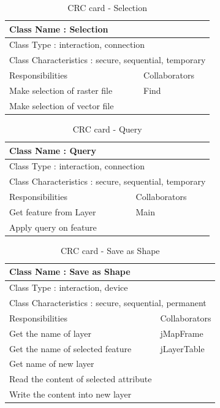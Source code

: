 \begin{table}[h]
\begin{tabular}{|p{7cm}|p{7cm}|}
  \hline
  \multicolumn{2}{|l|}{ Class Name :   Selection} \\
  \hline
  \multicolumn{2}{|l|}{ Class Type : interaction, connection} \\
  \hline
  \multicolumn{2}{|l|}{ Class Characteristics : secure, sequential, temporary} \\
  \hline
  Responsibilities & Collaborators  \\
  \hline
  Make selection of raster file & Find \\
  Make selection of vector file & \\
  \hline
\end{tabular}
\caption[CRC card - Selection]{CRC card - Selection}
\end{table}

\begin{table}[h]
\begin{tabular}{|p{7cm}|p{7cm}|}
  \hline
  \multicolumn{2}{|l|}{ Class Name : Query} \\
  \hline
  \multicolumn{2}{|l|}{ Class Type : interaction, connection} \\
  \hline
  \multicolumn{2}{|l|}{ Class Characteristics : secure, sequential, temporary} \\
  \hline
  Responsibilities & Collaborators  \\
  \hline
  Get feature from Layer  & Main\\
  Apply query on feature & \\
  \hline
\end{tabular}
\caption[CRC card - Query]{CRC card - Query}
\end{table}

\begin{table}[h]
\begin{tabular}{|p{7cm}|p{7cm}|}
  \hline
  \multicolumn{2}{|l|}{ Class Name : Save as Shape} \\
  \hline
  \multicolumn{2}{|l|}{ Class Type : interaction, device} \\
  \hline
  \multicolumn{2}{|l|}{ Class Characteristics : secure, sequential, permanent} \\
  \hline
  Responsibilities & Collaborators  \\
  \hline
  Get the name of layer & jMapFrame \\
  Get the name of selected feature & jLayerTable \\
  Get name of new layer & \\
  Read the content of selected attribute & \\
  Write the content into new layer & \\
  \hline
\end{tabular}
\caption[CRC card - Save as Shape]{CRC card - Save as Shape}
\end{table}

